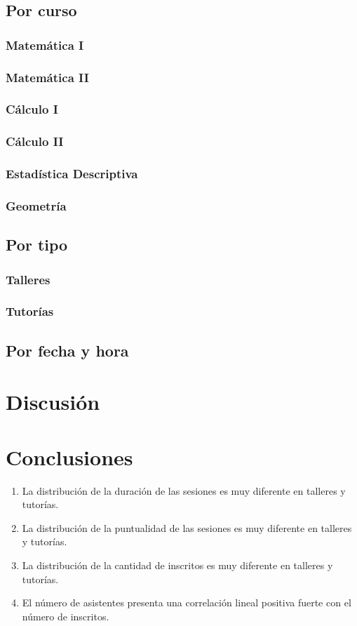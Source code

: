 \documentclass[11pt,a4paper]{book}
\theoremstyle{definition}%
\begin{document}
        \section{Por curso}
            \subsection{Matemática I}
            \subsection{Matemática II}
            \subsection{Cálculo I}
            \subsection{Cálculo II}
            \subsection{Estadística Descriptiva}
            \subsection{Geometría}
        \section{Por tipo}
            \subsection{Talleres}
            \subsection{Tutorías}
        \section{Por fecha y hora}
    \chapter{Discusión}
        
    \chapter{Conclusiones}
        \begin{enumerate}
            \item La distribución de la duración de las sesiones es muy diferente en talleres y tutorías.
            \item La distribución de la puntualidad de las sesiones es muy diferente en talleres y tutorías.
            \item La distribución de la cantidad de inscritos es muy diferente en talleres y tutorías.
            \item El número de asistentes presenta una correlación lineal positiva fuerte con el número de inscritos.
        \end{enumerate}
\end{document}
